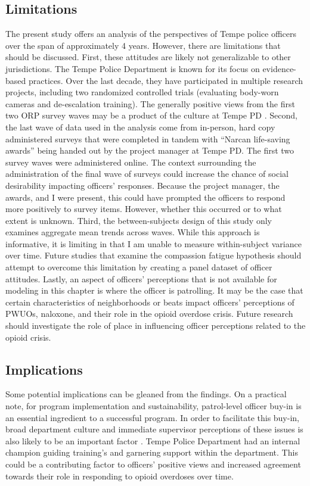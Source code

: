 \subsection{Limitations}
The present study offers an analysis of the perspectives of Tempe police officers over the span of approximately 4 years. However, there are limitations that should be discussed. First, these attitudes are likely not generalizable to other jurisdictions. The Tempe Police Department is known for its focus on evidence-based practices. Over the last decade, they have participated in multiple research projects, including two randomized controlled trials (evaluating body-worn cameras and de-escalation training). The generally positive views from the first two ORP survey waves may be a product of the culture at Tempe PD \parencite{white_narcan_2021}. Second, the last wave of data used in the analysis come from in-person, hard copy administered surveys that were completed in tandem with “Narcan life-saving awards” being handed out by the project manager at Tempe PD. The first two survey waves were administered online. The context surrounding the administration of the final wave of surveys could increase the chance of social desirability impacting officers’ responses. Because the project manager, the awards, and I were present, this could have prompted the officers to respond more positively to survey items. However, whether this occurred or to what extent is unknown. Third, the between-subjects design of this study only examines aggregate mean trends across waves. While this approach is informative, it is limiting in that I am unable to measure within-subject variance over time. Future studies that examine the compassion fatigue hypothesis should attempt to overcome this limitation by creating a panel dataset of officer attitudes. Lastly, an aspect of officers' perceptions that is not available for modeling in this chapter is where the officer is patrolling. It may be the case that certain characteristics of neighborhoods or beats impact officers' perceptions of PWUOs, naloxone, and their role in the opioid overdose crisis. Future research should investigate the role of place in influencing officer perceptions related to the opioid crisis. 

\subsection{Implications}
Some potential implications can be gleaned from the findings. On a practical note, for program implementation and sustainability, patrol-level officer buy-in is an essential ingredient to a successful program. In order to facilitate this buy-in, broad department culture and immediate supervisor perceptions of these issues is also likely to be an important factor \parencite{del_pozo_police_2024}. Tempe Police Department had an internal champion guiding training's and garnering support within the department. This could be a contributing factor to officers' positive views and increased agreement towards their role in responding to opioid overdoses over time. 

